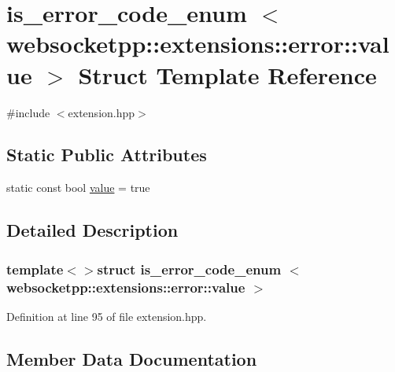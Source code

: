 \hypertarget{structis__error__code__enum_01_01_01_01_3_01websocketpp_1_1extensions_1_1error_1_1value_01_4}{}\section{is\+\_\+error\+\_\+code\+\_\+enum $<$ websocketpp\+:\+:extensions\+:\+:error\+:\+:value $>$ Struct Template Reference}
\label{structis__error__code__enum_01_01_01_01_3_01websocketpp_1_1extensions_1_1error_1_1value_01_4}


{\ttfamily \#include $<$extension.\+hpp$>$}

\subsection*{Static Public Attributes}
\begin{DoxyCompactItemize}
\item 
static const bool \hyperlink{structis__error__code__enum_01_01_01_01_3_01websocketpp_1_1extensions_1_1error_1_1value_01_4_a035870062b1c893460f245bb070efc5e}{value} = true
\end{DoxyCompactItemize}


\subsection{Detailed Description}
\subsubsection*{template$<$$>$struct is\+\_\+error\+\_\+code\+\_\+enum    $<$ websocketpp\+::extensions\+::error\+::value $>$}



Definition at line 95 of file extension.\+hpp.



\subsection{Member Data Documentation}
\hypertarget{structis__error__code__enum_01_01_01_01_3_01websocketpp_1_1extensions_1_1error_1_1value_01_4_a035870062b1c893460f245bb070efc5e}{}

